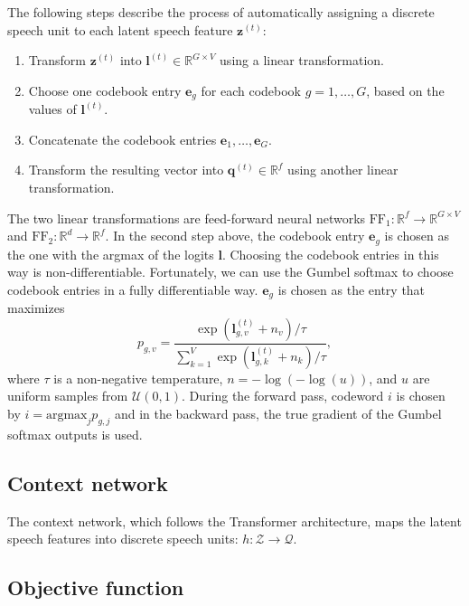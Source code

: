The following steps describe the process of automatically assigning a discrete speech unit to each latent speech feature $\mathbf{z}^{(t)}$:
\begin{enumerate}
    \item Transform $\mathbf{z}^{(t)}$ into $\mathbf{l}^{(t)} \in \mathbb{R}^{G \times V}$ using a linear transformation.
    \item Choose one codebook entry $\mathbf{e}_g$ for each codebook $g = 1, \dots, G$, based on the values of $\mathbf{l}^{(t)}$.
    \item Concatenate the codebook entries $\mathbf{e}_1, \dots, \mathbf{e}_G$.
    \item Transform the resulting vector into $\mathbf{q}^{(t)} \in \mathbb{R}^{f}$ using another linear transformation.
\end{enumerate}
The two linear transformations are feed-forward neural networks $\text{FF}_1: \mathbb{R}^{f} \rightarrow \mathbb{R}^{G \times V}$ and $\text{FF}_2: \mathbb{R}^{d} \rightarrow \mathbb{R}^{f}$.
In the second step above, the codebook entry $\mathbf{e}_g$ is chosen as the one with the argmax of the logits $\mathbf{l}$. Choosing the codebook entries in this way is non-differentiable.
Fortunately, we can use the Gumbel softmax to choose codebook entries in a fully differentiable way. 
$\mathbf{e}_g$ is chosen as the entry that maximizes
\begin{equation}
    p_{g, v} = \dfrac{\exp{\left(\mathbf{l}^{(t)}_{g, v} + n_v\right)}/\tau}{\sum\limits_{k=1}^{V} \exp{\left(\mathbf{l}^{(t)}_{g, k} + n_k\right)}/\tau},
\end{equation}
where $\tau$ is a non-negative temperature, $n = -\log{(-\log{(u)})}$, and $u$ are uniform samples from $\mathcal{U}(0, 1)$.
During the forward pass, codeword $i$ is chosen by $i = \text{argmax}_j p_{g,j}$ and in the backward pass, the true gradient of the Gumbel softmax outputs is used.



\subsection{Context network}
The context network, which follows the Transformer architecture, maps the latent speech features into discrete speech units: $h: \mathcal{Z} \rightarrow \mathcal{Q}$.



\subsection{Objective function}


